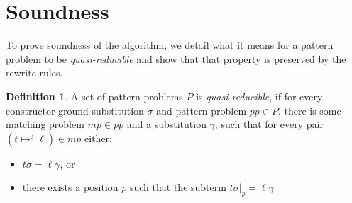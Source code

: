 \documentclass{report}
\theoremstyle{definition}
\newtheorem{definition_inner}{Definition}
\newenvironment{definition}
  {\begin{customblock}\begin{definition_inner}}
  {\end{definition_inner}\end{customblock}}
\begin{document}
\section{Soundness}\label{section:soundness}
To prove soundness of the algorithm, we detail what it means for a pattern problem to be \textit{quasi-reducible} and show that that property is preserved by the rewrite rules.

\begin{definition} 
A set of pattern problems $P$ is \textit{quasi-reducible}, if for every constructor ground substitution $\sigma$ and pattern problem $pp \in P$, there is some matching problem $mp \in pp$ and a substitution $\gamma$, such that for every pair $(t\mapsto^? \ell) \in mp$ either:
\begin{itemize}
    \item $t\sigma = \ell\gamma$, or
    \item there exists a position $p$ such that the subterm $t\sigma|_p = \ell\gamma$ 
\end{itemize}
\end{definition}
\end{document}
